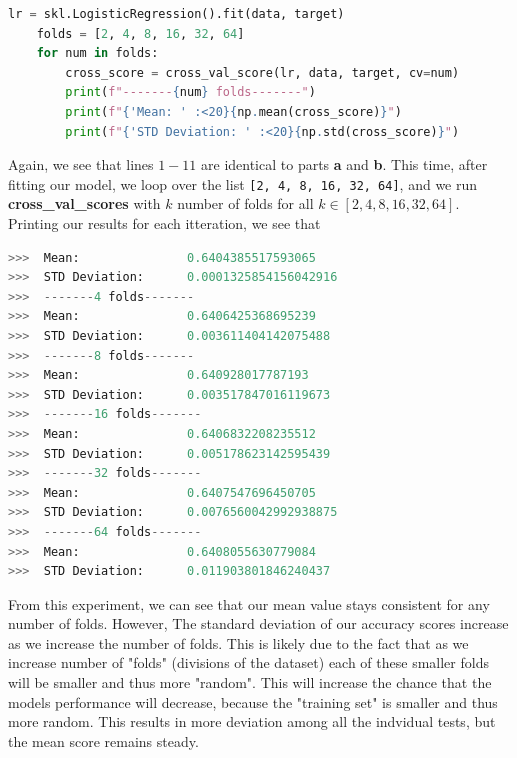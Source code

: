 \documentclass[12pt, letterpaper]{article}
\begin{document}
\begin{enumerate}
\begin{lstlisting}[language=python]
    lr = skl.LogisticRegression().fit(data, target)
    folds = [2, 4, 8, 16, 32, 64]
    for num in folds:
        cross_score = cross_val_score(lr, data, target, cv=num)
        print(f"-------{num} folds-------")
        print(f"{'Mean: ' :<20}{np.mean(cross_score)}")
        print(f"{'STD Deviation: ' :<20}{np.std(cross_score)}")
\end{lstlisting}
    Again, we see that lines $1-11$ are identical to parts {\bf a} and {\bf b}. 
    This time, after fitting our model, we loop over the list \texttt{[2, 4, 8, 16, 32, 64]}, 
    and we run {\bf cross\_val\_scores} with $k$ number of folds for all $k \in [2, 4, 8, 16, 32, 64]$. 
    Printing our results for each itteration, we see that 
\begin{lstlisting}[language = python]
>>>  Mean:               0.6404385517593065
>>>  STD Deviation:      0.0001325854156042916
>>>  -------4 folds-------
>>>  Mean:               0.6406425368695239
>>>  STD Deviation:      0.003611404142075488
>>>  -------8 folds-------
>>>  Mean:               0.640928017787193
>>>  STD Deviation:      0.003517847016119673
>>>  -------16 folds-------
>>>  Mean:               0.6406832208235512
>>>  STD Deviation:      0.005178623142595439
>>>  -------32 folds-------
>>>  Mean:               0.6407547696450705
>>>  STD Deviation:      0.0076560042992938875
>>>  -------64 folds-------
>>>  Mean:               0.6408055630779084
>>>  STD Deviation:      0.011903801846240437
\end{lstlisting}
    From this experiment, we can see that our mean value stays consistent for any
    number of folds. However, The standard deviation of our accuracy scores increase 
    as we increase the number of folds. This is likely due to the fact that as we increase
    number of "folds" (divisions of the dataset) each of these smaller folds will be smaller 
    and thus more "random".
    This will increase the chance that the models performance will 
    decrease, because the "training set" is smaller and thus more random. This results in more
    deviation among all the indvidual tests, but the mean score remains steady. 
\end{enumerate}

\newpage
\noindent\makebox[\linewidth]{\rule{18cm}{0.4pt}}
\end{document}
